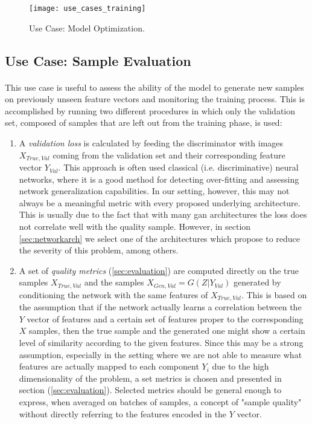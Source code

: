 \begin{figure}[h!]
	\begin{center}
		\texttt{[image: use\_cases\_training]}
	\end{center}
	
	\captionsetup{width=\linewidth}
	\caption[Use Case: Model Optimization]{Use Case: Model Optimization.}
	\label{fig:usecase_train}
\end{figure}



\subsection{Use Case: Sample Evaluation}
\label{sec:usecase_valid}
\paragraph{} This use case is useful to assess the ability of the model to generate new samples on previously unseen feature vectors and monitoring the training process. This is accomplished by running two different procedures in which only the validation set, composed of samples that are left out from the training phase, is used:
\begin{enumerate}
	\item A \textit{validation loss} is calculated by feeding the discriminator with images $X_{True, Val}$ coming from the validation set and their corresponding feature vector $Y_{Val}$. This approach is often used classical (i.e. discriminative) neural networks, where it is a good method for detecting over-fitting and assessing network generalization capabilities. In our setting, however, this may not always be a meaningful metric with every proposed underlying architecture. This is usually due to the fact that with many \gls{gan} architectures the loss does not correlate well with the quality sample. However, in section \ref{sec:networkarch} we select one of the architectures which propose to reduce the severity of this problem, among others. 
	\item  A set of \textit{quality metrics} (\ref{sec:evaluation}) are computed directly on the true samples $X_{True, Val}$ and the samples $X_{Gen, Val} = G(Z | Y_{Val}) $ generated by conditioning the network with the same features of $X_{True, Val}$. This is based on the assumption that if the network actually learns a correlation between the $Y$ vector of features and a certain set of features proper to the corresponding $X$ samples, then the true sample and the generated one might show a certain level of similarity according to the given features. Since this may be a strong assumption, especially in the setting where we are not able to measure what features are actually mapped to each component
	 $Y_i$ due to the high dimensionality of the problem, a set metrics is chosen and presented in section (\ref{sec:evaluation}). Selected metrics should be general enough to express, when averaged on batches of samples, a concept of "sample quality" without directly referring to the features encoded in the $Y$ vector.
\end{enumerate}
